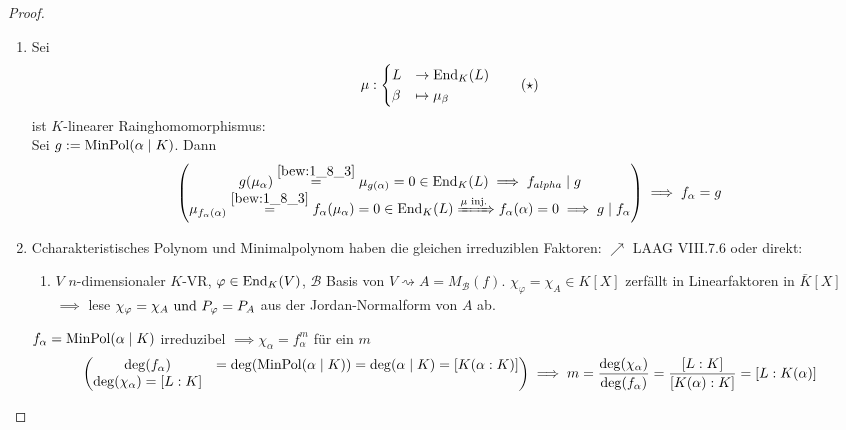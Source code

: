 \begin{proof}
	\begin{enumerate}
		\item Sei
		\begin{align*}
			\mu: \begin{cases}
			L & \to \operatorname{End}_K(L)\\
			\beta & \mapsto \mu_{\beta} 
			\end{cases} \tag{$\star$} \label{bew:1_8_3}
		\end{align*}
		ist $K$-linearer Rainghomomorphismus: \checkmark\\
		Sei $g:= \operatorname{MinPol}(\alpha \mid K)$. Dann
		\begin{align*}
			\begin{pmatrix}
			g(\mu_{\alpha}) \overset{\eqref{bew:1_8_3}}{=} \mu_{g(\alpha)} = 0 \in \operatorname{End}_K(L) \implies f_{alpha}\mid g\\
			\mu_{f_{\alpha}(\alpha)} \overset{\eqref{bew:1_8_3}}{=} f_{\alpha}(\mu_{\alpha}) = 0 \in \operatorname{End}_K(L) \xRightarrow{\mu \text{ inj.}} f_{\alpha}(\alpha) = 0 \implies g \mid f_{\alpha}
			\end{pmatrix} \implies f_{\alpha} = g
		\end{align*}
		\item Ccharakteristisches Polynom und Minimalpolynom haben die gleichen irreduziblen Faktoren: $\nearrow$ LAAG VIII.7.6 oder direkt:
		\begin{enumerate}[option]
			\item $V$ $n$-dimensionaler $K$-VR, $\varphi \in \operatorname{End}_K(V)$, $\mathscr{B}$ Basis von $V \rightsquigarrow A = M_{\mathscr{B}}(f)$. $\chi_{\varphi} = \chi_A \in K[X]$ zerfällt in Linearfaktoren in $\bar{K}[X]$\\
			$\implies$ lese $\chi_{\varphi} = \chi_A \text{ und } P_{\varphi} = P_A$ aus der Jordan-Normalform von $A$ ab.
		\end{enumerate}
		$f_{\alpha} = \operatorname{MinPol}(\alpha\mid K)$ irreduzibel $\implies \chi_{\alpha} = f_{\alpha}^m$ für ein $m$\\
		\begin{align*}
			\begin{pmatrix}
			\deg(f_{\alpha}) &= \deg(\operatorname{MinPol}(\alpha\mid K)) = \deg(\alpha \mid K) = [K(\alpha : K)]\\
			\deg(\chi_{\alpha}) = [L:K]
			\end{pmatrix}\implies m = \frac{\deg(\chi_{\alpha})}{\deg(f_{\alpha})} = \frac{[L:K]}{[K(\alpha):K]} = [L:K(\alpha)]
		\end{align*}
	\end{enumerate}
\end{proof}
